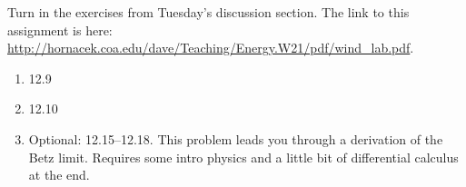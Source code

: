 \documentclass[12pt]{article}
\begin{document}
Turn in the exercises from Tuesday's discussion section.  The link to
this assignment is here:
\url{http://hornacek.coa.edu/dave/Teaching/Energy.W21/pdf/wind_lab.pdf}.\\   

\begin{enumerate}
\setlength{\itemsep}{-1mm}
\item 12.9
\item 12.10  
\item Optional: 12.15--12.18.  This problem leads you through a
  derivation of the Betz limit.  Requires some intro physics and a
  little bit of differential calculus at the end.  
\end{enumerate}
\end{document}
